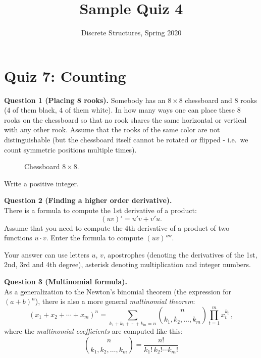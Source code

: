 \documentclass[jou]{apa6}
\title{Sample Quiz 4}
\author{Discrete Structures, Spring 2020}
\affiliation{RBS}
\begin{document}

\twocolumn
\section{Quiz 7: Counting}


\vspace{10pt}
{\bf Question 1 (Placing 8 rooks).} Somebody has an $8 \times 8$ chessboard and 
$8$ rooks ($4$ of them black, $4$ of them white). 
In how many ways one can place these $8$ rooks on the chessboard so that 
no rook shares the same horizontal or vertical with any other rook. 
Assume that the rooks of the same color are not distinguishable (but the chessboard itself cannot be rotated 
or flipped - i.e.\ we count symmetric positions multiple times).
\begin{figure}[!htb]
\caption{\label{fig:chessboard} Chessboard $8 \times 8$.}
\end{figure}

Write a positive integer.



\vspace{6pt}
{\bf Question 2 (Finding a higher order derivative).}\\
There is a formula to compute the 1st derivative of a product: 
$$(uv)' = u'v + v'u.$$
Assume that you need to compute the 4th derivative of a product of two functions $u\cdot v$. 
Enter the formula to compute $(uv)''''$. 

Your answer can use letters $u$, $v$, 
apostrophes (denoting the derivatives of the 1st, 2nd, 3rd and 4th degree), 
asterisk {\tt *} denoting multiplication and integer numbers. 


\vspace{6pt}
{\bf Question 3 (Multinomial formula).}\\
As a generalization to the Newton's binomial theorem (the expression for $(a+b)^n$), there
is also a more general {\em multinomial theorem}: 
$$(x_1 + x_2  + \cdots + x_m)^n
 = \sum\limits_{k_1+k_2+\cdots+k_m=n} {n \choose k_1, k_2, \ldots, k_m}
  \prod_{t=1}^m x_t^{k_t}\,,$$
where the {\em multinomial coefficients} are computed like this:
$${n \choose k_1, k_2, \ldots, k_m}
 = \frac{n!}{k_1!\, k_2! \cdots k_m!}$$
\end{document}
